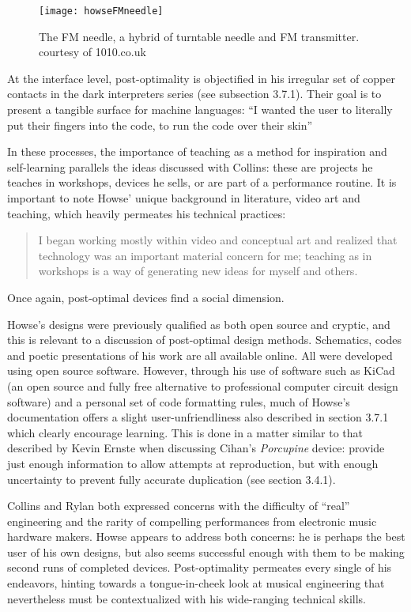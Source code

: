 \begin{figure}[H]
	  \caption{The FM needle, a hybrid of turntable needle and FM transmitter. courtesy of 1010.co.uk}
	  \centering
	    \texttt{[image: howseFMneedle]}
	\end{figure}
	
At the interface level, post-optimality is objectified in his irregular set of copper contacts in the dark interpreters series (see subsection 3.7.1). Their goal is to present a tangible surface for machine languages: ``I wanted the user to literally put their fingers into the code, to run the code over their skin'' 

In these processes, the importance of teaching as a method for inspiration and self-learning parallels the ideas discussed with Collins: these are projects he teaches in workshops, devices he sells, or are part of a performance routine. It is important to note Howse' unique background in literature, video art and teaching, which heavily permeates his technical practices: 

\begin{quote}
	 I began working mostly within video and conceptual art and realized that technology was an important material concern for me; teaching as in workshops is a way of generating new ideas for myself and others.
\end{quote}

Once again, post-optimal devices find a social dimension.
 
Howse's designs were previously qualified as both open source and cryptic, and this is relevant to a discussion of post-optimal design methods. Schematics, codes and poetic presentations of his work are all available online. All were developed using open source software. However, through his use of software such as KiCad (an open source and fully free alternative to professional computer circuit design software) and a personal set of code formatting rules, much of Howse's documentation offers a slight user-unfriendliness also described in section 3.7.1 which clearly encourage learning. This is done in a matter similar to that described by Kevin Ernste when discussing Cihan's \textit{Porcupine} device: provide just enough information to allow attempts at reproduction, but with enough uncertainty to prevent fully accurate duplication (see section 3.4.1).  

Collins and Rylan both expressed concerns with the difficulty of ``real'' engineering and the rarity of compelling performances from electronic music hardware makers. Howse appears to address both concerns: he is perhaps the best user of his own designs, but also seems successful enough with them to be making second runs of completed devices. Post-optimality permeates every single of his endeavors, hinting towards a tongue-in-cheek look at musical engineering that nevertheless must be contextualized with his wide-ranging technical skills.

